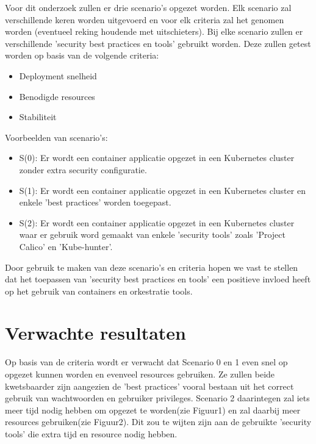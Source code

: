 Voor dit onderzoek zullen er drie scenario's opgezet worden. Elk scenario zal verschillende keren worden uitgevoerd en voor elk criteria zal het genomen worden (eventueel reking houdende met uitschieters). 
Bij elke scenario zullen er verschillende 'security best practices en tools' gebruikt worden. 
Deze zullen getest worden op basis van de volgende criteria: \newline
\begin{itemize}
	\item Deployment snelheid
	\item Benodigde resources
	\item Stabiliteit \newline
\end{itemize} 
Voorbeelden van scenario's: \newline
\begin{itemize}
	\item S(0): Er wordt een container applicatie opgezet in een Kubernetes cluster zonder extra security configuratie.
	\item S(1): Er wordt een container applicatie opgezet in een Kubernetes cluster en enkele 'best practices' worden toegepast.
	\item S(2): Er wordt een container applicatie opgezet in een Kubernetes cluster waar er gebruik word gemaakt van enkele 'security tools' zoals 'Project Calico' en 'Kube-hunter'. \newline
\end{itemize} 
Door gebruik te maken van deze scenario's en criteria hopen we vast te stellen dat het toepassen van 'security best practices en tools' een positieve invloed heeft op het gebruik van containers en orkestratie tools. 

\section{Verwachte resultaten}
\label{sec:verwachte_resultaten}

Op basis van de criteria wordt er verwacht dat Scenario 0 en 1 even snel op opgezet kunnen worden en evenveel resources gebruiken. 
Ze zullen beide kwetsbaarder zijn aangezien de 'best practices' vooral bestaan uit het correct gebruik van wachtwoorden en gebruiker privileges. 
Scenario 2 daarintegen zal iets meer tijd nodig hebben om opgezet te worden(zie Figuur1) en zal daarbij meer resources gebruiken(zie Figuur2). Dit zou te wijten zijn aan de gebruikte 'security tools' die extra tijd en resource nodig hebben. 


